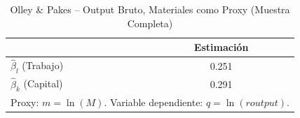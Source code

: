\begin{table}[H]
\centering
\caption{Olley \& Pakes -- Output Bruto, Materiales como Proxy (Muestra Completa)}
\begin{tabular}{lc}
\toprule
 & Estimación \\
\midrule
$\hat{\beta}_l$ (Trabajo) & 0.251 \\
$\hat{\beta}_k$ (Capital) & 0.291 \\
\bottomrule
\multicolumn{2}{l}{\small Proxy: $m = \ln(M)$. Variable dependiente: $q = \ln(\mathit{routput})$.}
\end{tabular}
\end{table}
